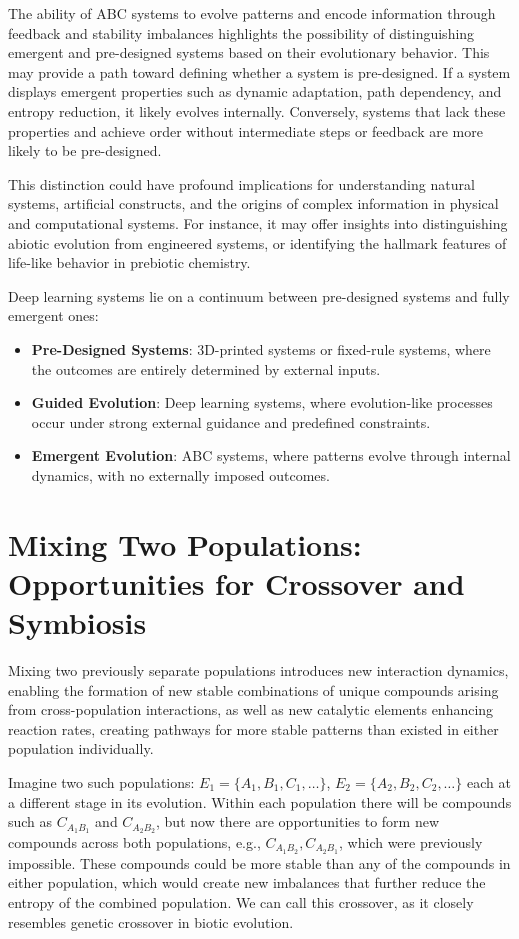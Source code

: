 \documentclass[entropy,article,submit,pdftex,moreauthors]{Definitions/mdpi}
\begin{document}
The ability of ABC systems to evolve patterns and encode information through feedback and stability imbalances highlights the possibility of distinguishing emergent and pre-designed systems based on their evolutionary behavior. This may provide a path toward defining whether a system is pre-designed. If a system displays emergent properties such as dynamic adaptation, path dependency, and entropy reduction, it likely evolves internally. Conversely, systems that lack these properties and achieve order without intermediate steps or feedback are more likely to be pre-designed.

This distinction could have profound implications for understanding natural systems, artificial constructs, and the origins of complex information in physical and computational systems. For instance, it may offer insights into distinguishing abiotic evolution from engineered systems, or identifying the hallmark features of life-like behavior in prebiotic chemistry.

Deep learning systems lie on a continuum between pre-designed systems and fully emergent ones:
\begin{itemize}
    \item \textbf{Pre-Designed Systems}: 3D-printed systems or fixed-rule systems, where the outcomes are entirely determined by external inputs.
    \item \textbf{Guided Evolution}: Deep learning systems, where evolution-like processes occur under strong external guidance and predefined constraints.
    \item \textbf{Emergent Evolution}: ABC systems, where patterns evolve through internal dynamics, with no externally imposed outcomes.
\end{itemize}


\section{Mixing Two Populations: Opportunities for Crossover and Symbiosis}

Mixing two previously separate populations introduces new interaction dynamics, enabling the formation of new stable combinations of unique compounds arising from cross-population interactions, as well as new catalytic elements enhancing reaction rates, creating pathways for more stable patterns than existed in either population individually.

Imagine two such populations: \( E_1 = \{A_1, B_1, C_1, \dots\} \), \( E_2 = \{A_2, B_2, C_2, \dots\} \) each at a different stage in its evolution. Within each population there will be compounds such as \( C_{A_1B_1} \) and \( C_{A_2B_2} \), but now there are opportunities to form new compounds across both populations, e.g., \( C_{A_1B_2}, C_{A_2B_1} \), which were previously impossible. These compounds could be more stable than any of the compounds in either population, which would create new imbalances that further reduce the entropy of the combined population. We can call this crossover, as it closely resembles genetic crossover in biotic evolution.
\end{document}
